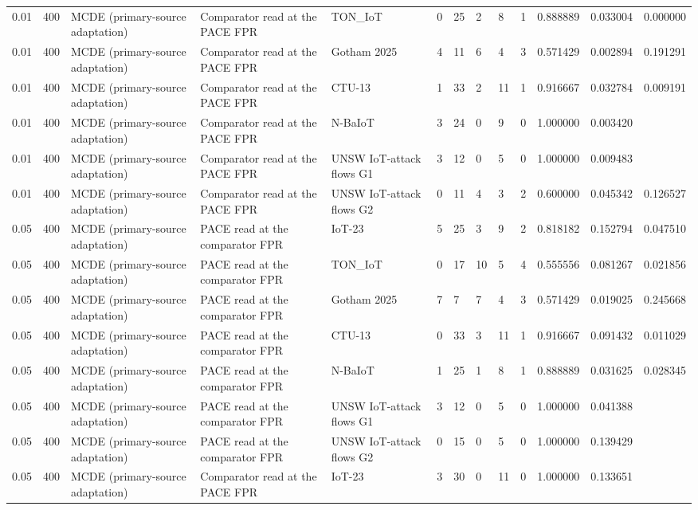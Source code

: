 \begin{tabular}{lllllllllllll}
0.01 & 400 & MCDE (primary-source adaptation) & Comparator read at the PACE FPR & TON\_IoT & 0 & 25 & 2 & 8 & 1 & 0.888889 & 0.033004 & 0.000000 \\
0.01 & 400 & MCDE (primary-source adaptation) & Comparator read at the PACE FPR & Gotham 2025 & 4 & 11 & 6 & 4 & 3 & 0.571429 & 0.002894 & 0.191291 \\
0.01 & 400 & MCDE (primary-source adaptation) & Comparator read at the PACE FPR & CTU-13 & 1 & 33 & 2 & 11 & 1 & 0.916667 & 0.032784 & 0.009191 \\
0.01 & 400 & MCDE (primary-source adaptation) & Comparator read at the PACE FPR & N-BaIoT & 3 & 24 & 0 & 9 & 0 & 1.000000 & 0.003420 &  \\
0.01 & 400 & MCDE (primary-source adaptation) & Comparator read at the PACE FPR & UNSW IoT-attack flows G1 & 3 & 12 & 0 & 5 & 0 & 1.000000 & 0.009483 &  \\
0.01 & 400 & MCDE (primary-source adaptation) & Comparator read at the PACE FPR & UNSW IoT-attack flows G2 & 0 & 11 & 4 & 3 & 2 & 0.600000 & 0.045342 & 0.126527 \\
0.05 & 400 & MCDE (primary-source adaptation) & PACE read at the comparator FPR & IoT-23 & 5 & 25 & 3 & 9 & 2 & 0.818182 & 0.152794 & 0.047510 \\
0.05 & 400 & MCDE (primary-source adaptation) & PACE read at the comparator FPR & TON\_IoT & 0 & 17 & 10 & 5 & 4 & 0.555556 & 0.081267 & 0.021856 \\
0.05 & 400 & MCDE (primary-source adaptation) & PACE read at the comparator FPR & Gotham 2025 & 7 & 7 & 7 & 4 & 3 & 0.571429 & 0.019025 & 0.245668 \\
0.05 & 400 & MCDE (primary-source adaptation) & PACE read at the comparator FPR & CTU-13 & 0 & 33 & 3 & 11 & 1 & 0.916667 & 0.091432 & 0.011029 \\
0.05 & 400 & MCDE (primary-source adaptation) & PACE read at the comparator FPR & N-BaIoT & 1 & 25 & 1 & 8 & 1 & 0.888889 & 0.031625 & 0.028345 \\
0.05 & 400 & MCDE (primary-source adaptation) & PACE read at the comparator FPR & UNSW IoT-attack flows G1 & 3 & 12 & 0 & 5 & 0 & 1.000000 & 0.041388 &  \\
0.05 & 400 & MCDE (primary-source adaptation) & PACE read at the comparator FPR & UNSW IoT-attack flows G2 & 0 & 15 & 0 & 5 & 0 & 1.000000 & 0.139429 &  \\
0.05 & 400 & MCDE (primary-source adaptation) & Comparator read at the PACE FPR & IoT-23 & 3 & 30 & 0 & 11 & 0 & 1.000000 & 0.133651 &  \\

\end{tabular}
